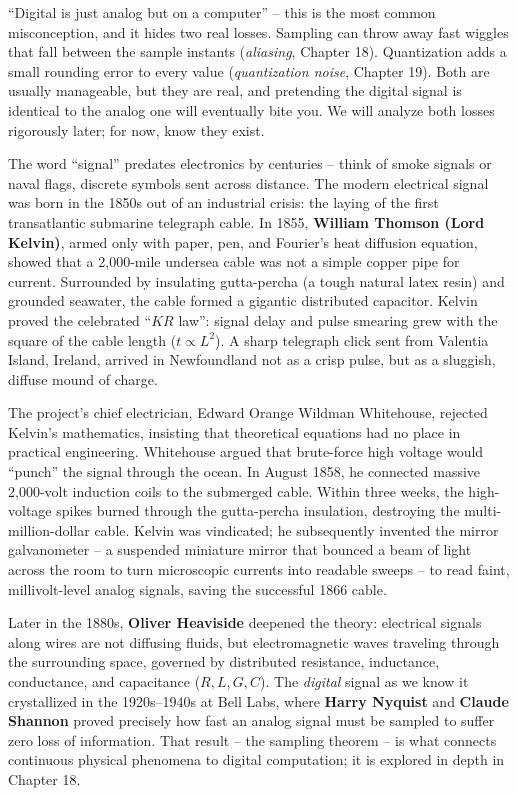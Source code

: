 \begin{trapbox}
``Digital is just analog but on a computer'' -- this is the most common misconception, and
it hides two real losses. Sampling can throw away fast wiggles that fall between the sample
instants (\emph{aliasing}, Chapter 18). Quantization adds a small rounding error to every value
(\emph{quantization noise}, Chapter 19). Both are usually manageable, but they are real, and
pretending the digital signal is identical to the analog one will eventually bite you. We will
analyze both losses rigorously later; for now, know they exist.
\end{trapbox}

\begin{historybox}
The word ``signal'' predates electronics by centuries -- think of smoke signals or naval flags,
discrete symbols sent across distance. The modern electrical signal was born in the 1850s out of
an industrial crisis: the laying of the first transatlantic submarine telegraph cable.
In 1855, \textbf{William Thomson (Lord Kelvin)}, armed only with paper, pen, and Fourier's heat
diffusion equation, showed that a 2,000-mile undersea cable was not a simple copper pipe for
current. Surrounded by insulating gutta-percha (a tough natural latex resin) and grounded seawater, the cable formed a gigantic
distributed capacitor. Kelvin proved the celebrated ``$KR$ law'': signal delay and pulse smearing
grew with the square of the cable length ($t \propto L^2$). A sharp telegraph click sent from
Valentia Island, Ireland, arrived in Newfoundland not as a crisp pulse, but as a sluggish,
diffuse mound of charge.

The project's chief electrician, Edward Orange Wildman Whitehouse, rejected Kelvin's mathematics,
insisting that theoretical equations had no place in practical engineering. Whitehouse argued that
brute-force high voltage would ``punch'' the signal through the ocean. In August 1858, he connected
massive 2,000-volt induction coils to the submerged cable. Within three weeks, the high-voltage
spikes burned through the gutta-percha insulation, destroying the multi-million-dollar cable.
Kelvin was vindicated; he subsequently invented the mirror galvanometer -- a suspended miniature mirror that bounced a beam of light across the room to turn microscopic currents into readable sweeps -- to read faint, millivolt-level
analog signals, saving the successful 1866 cable.

Later in the 1880s, \textbf{Oliver Heaviside} deepened the theory: electrical signals along wires
are not diffusing fluids, but electromagnetic waves traveling through the surrounding space,
governed by distributed resistance, inductance, conductance, and capacitance ($R, L, G, C$).
The \emph{digital} signal as we know it crystallized in the 1920s--1940s at Bell Labs, where
\textbf{Harry Nyquist} and \textbf{Claude Shannon} proved precisely how fast an analog signal must
be sampled to suffer zero loss of information. That result -- the sampling theorem -- is what
connects continuous physical phenomena to digital computation; it is explored in
depth in Chapter 18.
\end{historybox}

